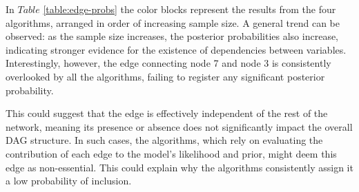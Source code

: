 \documentclass{report}
\begin{document}
In $\textit{Table}$ \ref{table:edge-probs} the color blocks represent the results from the four algorithms, arranged in order of increasing sample size. A general trend can be observed: as the sample size increases, the posterior probabilities also increase, indicating stronger evidence for the existence of dependencies between variables. Interestingly, however, the edge connecting node 7 and node 3 is consistently overlooked by all the algorithms, failing to register any significant posterior probability.

This could suggest that the edge is effectively independent of the rest of the network, meaning its presence or absence does not significantly impact the overall DAG structure. In such cases, the algorithms, which rely on evaluating the contribution of each edge to the model's likelihood and prior, might deem this edge as non-essential. This could explain why the algorithms consistently assign it a low probability of inclusion.
\end{document}

